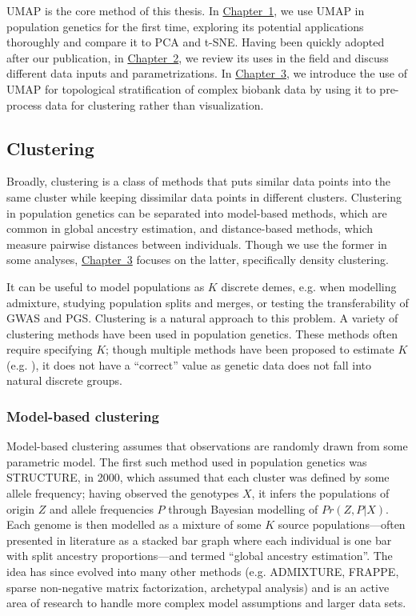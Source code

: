 UMAP is the core method of this thesis. In \hyperref[chap:chapter1]{Chapter~1}, we use UMAP in population genetics for the first time, exploring its potential applications thoroughly and compare it to PCA and t-SNE. Having been quickly adopted after our publication, in \hyperref[chap:chapter2]{Chapter~2}, we review its uses in the field and discuss different data inputs and parametrizations. In \hyperref[chap:chapter3]{Chapter~3}, we introduce the use of UMAP for topological stratification of complex biobank data by using it to pre-process data for clustering rather than visualization.

\subsection{Clustering}

Broadly, clustering is a class of methods that puts similar data points into the same cluster while keeping dissimilar data points in different clusters\citep{ben-david_clustering_2018}. Clustering in population genetics can be separated into model-based methods, which are common in global ancestry estimation, and distance-based methods, which measure pairwise distances between individuals. Though we use the former in some analyses, \hyperref[chap:chapter3]{Chapter~3} focuses on the latter, specifically density clustering.

It can be useful to model populations as $K$ discrete demes, e.g. when modelling admixture, studying population splits and merges, or testing the transferability of GWAS and PGS. Clustering is a natural approach to this problem. A variety of clustering methods have been used in population genetics. These methods often require specifying $K$; though multiple methods have been proposed to estimate $K$ (e.g. \citep{evanno_detecting_2005,verity_estimating_2016}), it does not have a ``correct'' value as genetic data does not fall into natural discrete groups\citep{lawson_tutorial_2018}.

\subsubsection{Model-based clustering}

Model-based clustering assumes that observations are randomly drawn from some parametric model. The first such method used in population genetics was STRUCTURE, in 2000, which assumed that each cluster was defined by some allele frequency; having observed the genotypes $X$, it infers the populations of origin $Z$ and allele frequencies $P$ through Bayesian modelling of $Pr(Z, P|X)$\citep{pritchard_inference_2000}. Each genome is then modelled as a mixture of some $K$ source populations---often presented in literature as a stacked bar graph where each individual is one bar with split ancestry proportions---and termed ``global ancestry estimation''\citep{alexander_fast_2009}. The idea has since evolved into many other methods (e.g. ADMIXTURE\citep{alexander_fast_2009}, FRAPPE\citep{tang_estimation_2005}, sparse non-negative matrix factorization\citep{frichot_fast_2014}, archetypal analysis\citep{gimbernat-mayol_archetypal_2022}) and is an active area of research to handle more complex model assumptions and larger data sets.


